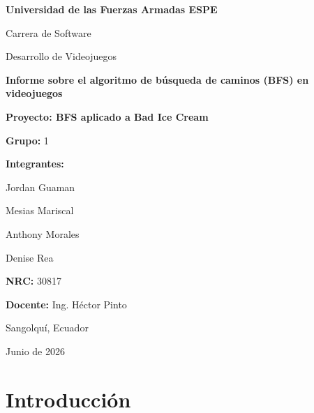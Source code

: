 \documentclass[12pt,letterpaper]{article}
\begin{document}
\vspace*{1.65cm}
\noindent\hspace*{4.65cm}
\begin{minipage}{0.66\textwidth}
  \begin{flushleft}
    {\Large\bfseries\color{espeGreen} Universidad de las Fuerzas Armadas ESPE\par}
    \vspace{0.25cm}
    {\large Carrera de Software\par}
    \vspace{0.2cm}
    {\large Desarrollo de Videojuegos\par}
    \vspace{1.55cm}
    {\fontsize{26}{31}\selectfont\bfseries\color{ink} Informe sobre el algoritmo de búsqueda de caminos (BFS) en videojuegos\par}
    \vspace{0.35cm}
    {\Large\color{softGold}\bfseries Proyecto: BFS aplicado a Bad Ice Cream\par}
    \vspace{1.0cm}
    \vspace{0.55cm}

    {\bfseries Grupo:} 1\par
    \vspace{0.25cm}
    {\bfseries Integrantes:}\par
    Jordan Guaman\par
    Mesias Mariscal\par
    Anthony Morales\par
    Denise Rea\par
    \vspace{0.35cm}
    {\bfseries NRC:} 30817\par
    {\bfseries Docente:} Ing. Héctor Pinto\par
    \vspace{0.55cm}
    Sangolquí, Ecuador\par
    Junio de 2026
  \end{flushleft}
\end{minipage}
\clearpage

\tableofcontents
\newpage

\section{Introducción}
\end{document}
